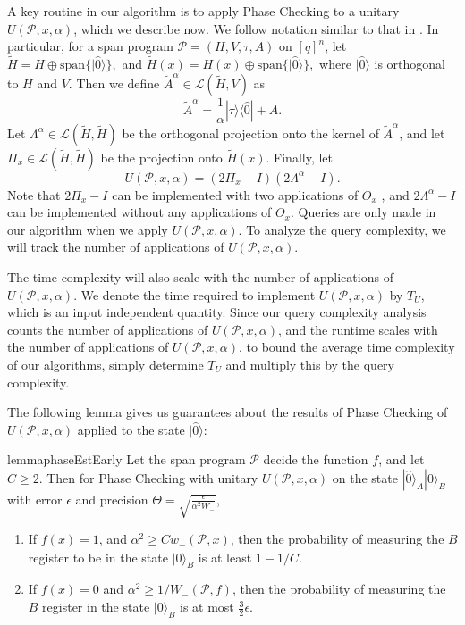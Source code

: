 \documentclass[cleveref, autoref, thm-restate,11pt]{article}
\theoremstyle{definition}
\newcommand{\sop}[1]{{\mathcal #1}}
\newcommand{\ket}[1]{|#1\rangle}
\newcommand{\ketbra}[2]{|{#1}\rangle\!\langle{#2}|}
\newcommand{\Lal}[1]{{\Lambda^{\!{#1}}}}
\newcommand{\U}[3]{{U({#1},{#2},{#3})}}
\renewcommand{\wp}[2]{{w_+({#1},{#2})}}
\newcommand{\Aa}[1]{{\tilde{A}^{#1}}}
\newcommand{\PtHx}{\Pi_{x}}
\begin{document}
A key routine in our algorithm is to apply Phase Checking to a unitary 
$\U{\sop P}{x}{\alpha}$, which we describe now. We follow notation similar to that
in \cite{belovsSpanProgramsQuantum2012}. In particular,
for a span program $\sop P=(H,V,\tau,A)$ on $[q]^n$, let $\tilde{H}=H\oplus \textrm{span}\{\ket{\hat{0}}\},$ and $\tilde{H}(x)=H(x)\oplus \textrm{span}\{\ket{\hat{0}}\},$
where $\ket{\hat{0}}$ is orthogonal to $H$ and $V$. Then
we define $\Aa{\alpha} \in \sop L(\tilde{H},V)$ as
\begin{equation}\label{eq:alphaIntro}
\Aa{\alpha}=\frac{1}{\alpha}\ketbra{\tau}{\hat{0}}+A.
\end{equation}
Let $\Lal{\alpha} \in \sop L(\tilde{H},\tilde{H})$ be the orthogonal
projection onto the kernel of $\Aa{\alpha}$, and let $\PtHx\in \sop
L(\tilde{H},\tilde{H})$ be the projection onto $\tilde{H}(x).$
Finally, let
\begin{equation}
\U{\sop P}{x}{\alpha}=(2\PtHx-I)(2\Lal{\alpha}-I).
\end{equation} 
Note that
$2\PtHx-I$ can be implemented with two applications of $O_x$ 
\cite[Lemma 3.1]{itoApproximateSpanPrograms2019}, and $2\Lal{\alpha}-I$ can be implemented
without any applications of $O_x$. Queries are only made in our algorithm when we apply $\U{\sop P}{x}{\alpha}$. To analyze the query complexity, we will track
the number of applications of $\U{\sop P}{x}{\alpha}.$

The time complexity will also scale with the number of applications of $\U{\sop P}{x}{\alpha}.$ We denote the time required to implement $\U{\sop P}{x}{\alpha}$ by $T_U$, which is an input independent quantity. Since our query complexity analysis
counts the number of applications of $\U{\sop P}{x}{\alpha}$, and 
the runtime scales with the number of applications of $\U{\sop P}{x}{\alpha}$,
to bound the average time complexity of our algorithms, simply determine $T_U$
and multiply this by the query complexity.

The following lemma gives us guarantees about the results of Phase Checking
of $\U{\sop P}{x}{\alpha}$ applied to the state $\ket{\hat{0}}$:
\begin{restatable}{lemma}{phaseEstEarly}\label{lem:phase_est_early}
Let the span program $\sop P$ decide the function $f$, and let $C\geq 2$. Then for Phase Checking with unitary $\U{\sop P}{x}{\alpha}$ on the
state $\ket{\hat{0}}_A\ket{0}_B$ with error $\epsilon$ and precision $\Theta=\sqrt{\frac{\epsilon}{\alpha^2 W_-}}$,
\begin{enumerate}
\item If $f(x)=1$, and $\alpha^2\geq C\wp{\sop P}{x}$, then the probability of measuring the $B$ register to be in the state $\ket{0}_B$ is at least $1-1/C$.
\label{part:phase_est_1}
\item If $f(x)=0$ and $\alpha^2 \geq  1/W_-(\sop P,f)$, then the probability of measuring the $B$ register in the state $\ket{0}_B$ is at most $\frac{3}{2}\epsilon.$ \label{part:phase_est_2}
\end{enumerate}
\end{restatable}
\end{document}
